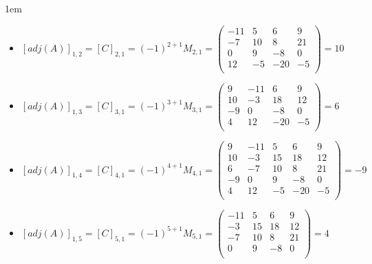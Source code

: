 \documentclass[12pt, fleqn]{article}                             %
\newenvironment{SmallIndentation}[1][0.75em]                    %
        {\begin{adjustwidth}{#1}{}\begin{footnotesize}}             %
        {\end{footnotesize}\end{adjustwidth}}                       %
\theoremstyle{break}                                            %
\newcommand{\pVector}[1]                                        %
        { \ensuremath{\begin{pmatrix}#1\end{pmatrix}} }             %
\begin{document}
\begin{itemize}
\begin{SmallIndentation}[1em]
\begin{itemize}
                    \item
                        $[adj(A)]_{1, 2} 
                            = [C]_{2, 1} 
                            = (-1)^{2+1} M_{2, 1}
                            = \pVector{
                                    -11 & 5  & 6   & 9    \\
                                    -7  & 10 & 8   & 21   \\
                                    0   & 9  & -8  & 0    \\
                                    12  & -5 & -20 & -5   \\
                                }
                            = 10$

                    \item
                        $[adj(A)]_{1, 3} 
                            = [C]_{3, 1} 
                            = (-1)^{3+1} M_{3, 1}
                            = \pVector{
                                    9  & -11 & 6   & 9    \\
                                    10 & -3  & 18  & 12   \\
                                    -9 & 0   & -8  & 0    \\
                                    4  & 12  & -20 & -5   \\
                                }
                            = 6$

                    \item
                        $[adj(A)]_{1, 4} 
                            = [C]_{4, 1} 
                            = (-1)^{4+1} M_{4, 1}
                            = \pVector{
                                    9  & -11 & 5  & 6   & 9    \\
                                    10 & -3  & 15 & 18  & 12   \\
                                    6  & -7  & 10 & 8   & 21   \\
                                    -9 & 0   & 9  & -8  & 0    \\
                                    4  & 12  & -5 & -20 & -5   \\
                                }
                            = -9$

                    \item
                        $[adj(A)]_{1, 5} 
                            = [C]_{5, 1} 
                            = (-1)^{5+1} M_{5, 1}
                            = \pVector{
                                    -11 & 5  & 6   & 9    \\
                                    -3  & 15 & 18  & 12   \\
                                    -7  & 10 & 8   & 21   \\
                                    0   & 9  & -8  & 0    \\
                                }
                            = 4$


\end{itemize}
\end{SmallIndentation}
\end{itemize}
\end{document}
